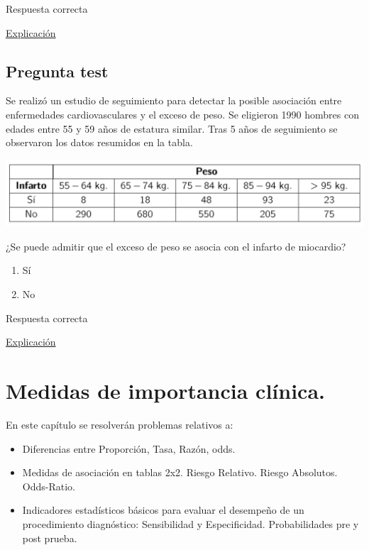 \documentclass[
]{book}
\providecommand{\tightlist}{%
  \setlength{\itemsep}{0pt}\setlength{\parskip}{0pt}}
\begin{document}
Respuesta correcta

\href{https://1fjmanzano.github.io/bioestadistica/me\%CC\%81todos-de-inferencia-estadi\%CC\%81stica.html\#prueba-de-la-chi-cuadrado}{Explicación}

\hypertarget{pregunta-test-156}{%
\section{Pregunta test}\label{pregunta-test-156}}

Se realizó un estudio de seguimiento para detectar la posible asociación entre enfermedades cardiovasculares y el exceso de peso. Se eligieron 1990 hombres con edades entre 55 y 59 años de estatura similar. Tras 5 años de seguimiento se observaron los datos resumidos en la tabla.

\includegraphics[width=21.47in]{img/5_7}

¿Se puede admitir que el exceso de peso se asocia con el infarto de miocardio?

\begin{enumerate}
\def\labelenumi{\alph{enumi})}
\tightlist
\item
  Sí
\item
  No
\end{enumerate}

Respuesta correcta

\href{https://1fjmanzano.github.io/bioestadistica/me\%CC\%81todos-de-inferencia-estadi\%CC\%81stica.html\#prueba-de-la-chi-cuadrado}{Explicación}

\hypertarget{medidas-de-importancia-cluxednica.}{%
\chapter{Medidas de importancia clínica.}\label{medidas-de-importancia-cluxednica.}}

En este capítulo se resolverán problemas relativos a:

\begin{itemize}
\tightlist
\item
  Diferencias entre Proporción, Tasa, Razón, odds.
\item
  Medidas de asociación en tablas 2x2. Riesgo Relativo. Riesgo Absolutos. Odds-Ratio.
\item
  Indicadores estadísticos básicos para evaluar el desempeño de un procedimiento diagnóstico: Sensibilidad y Especificidad. Probabilidades pre y post prueba.
\end{itemize}
\end{document}
